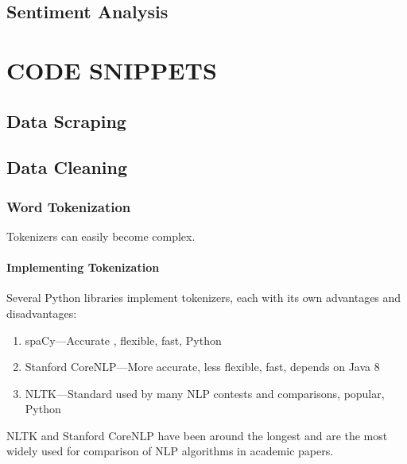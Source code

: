 \documentclass[
]{book}
\begin{document}
\hypertarget{sentiment-analysis}{%
\chapter{Sentiment Analysis}\label{sentiment-analysis}}

\hypertarget{part-code-snippets}{%
\part*{CODE SNIPPETS}\label{part-code-snippets}}

\hypertarget{data-scraping}{%
\chapter{Data Scraping}\label{data-scraping}}

\hypertarget{data-cleaning}{%
\chapter{Data Cleaning}\label{data-cleaning}}

\hypertarget{word-tokenization}{%
\section{Word Tokenization}\label{word-tokenization}}

Tokenizers can easily become complex.

\hypertarget{implementing-tokenization}{%
\subsection{Implementing Tokenization}\label{implementing-tokenization}}

Several Python libraries implement tokenizers, each with its own advantages and disadvantages:

\begin{enumerate}
\def\labelenumi{\arabic{enumi}.}
\item
  spaCy---Accurate , flexible, fast, Python
\item
  Stanford CoreNLP---More accurate, less flexible, fast, depends on Java 8
\item
  NLTK---Standard used by many NLP contests and comparisons, popular, Python
\end{enumerate}

NLTK and Stanford CoreNLP have been around the longest and are the most widely used for comparison of NLP algorithms in academic papers.
\end{document}
